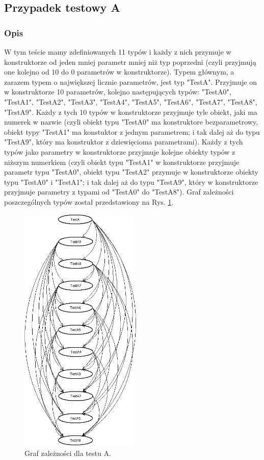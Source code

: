 \documentclass[12pt]{article}
\begin{document}
\subsection{Przypadek testowy A}
\subsubsection{Opis}
W tym teście mamy zdefiniowanych 11 typów i każdy z nich przymuje w konstruktorze od jeden mniej parametr mniej niż typ poprzedni (czyli przyjmują one kolejno od 10 do 0 parametrów w konstruktorze). Typem głównym, a zarazem typem o największej licznie parametrów, jest typ "TestA". Przyjmuje on w konstruktorze 10 parametrów, kolejno następujących typów: "TestA0", "TestA1", "TestA2", "TestA3", "TestA4", "TestA5", "TestA6", "TestA7", "TestA8", "TestA9". Każdy z tych 10 typów w konstruktorze przyjmuje tyle obiekt, jaki ma numerek w nazwie (czyli obiekt typu "TestA0" ma konstruktore bezparametrowy, obiekt typy "TestA1" ma konstuktor z jednym parametrem; i tak dalej aż do typu "TestA9", który ma konstruktor z dziewięcioma parametrami). Każdy z tych typów jako parametry w konstruktorze przyjmuje kolejne obiekty typów z niższym numerkiem (czyli obiekt typu "TestA1" w konstruktorze przyjmuje parametr typu "TestA0", obiekt typu "TestA2" przymuje w konstruktorze obiekty typu "TestA0" i "TestA1";  i tak dalej aż do typu "TestA9", który w konstruktorze przyjmuje parametry z typami od "TestA0" do "TestA8"). Graf zależności poszczególnych typów został przedstawiony na Rys. \ref{fig:testA}.\\

\clearpage
\begin{figure}[h]
	\begin{center}
  		\includegraphics[height=12cm]{TestA.png}
  		\caption{Graf zależności dla testu A.}
  		\label{fig:testA}
	\end{center}
\end{figure}
\end{document}
